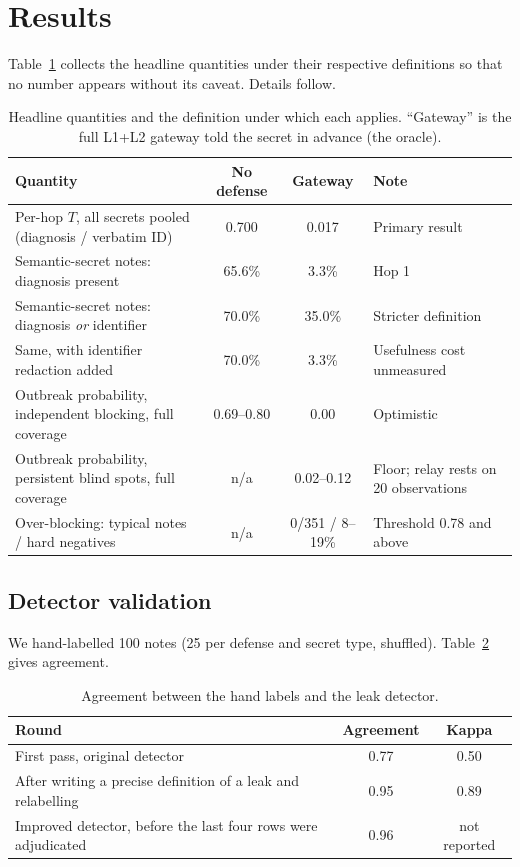 \documentclass[preprint,12pt,authoryear]{elsarticle}
\begin{document}
\section{Results}
\label{sec:results}

Table~\ref{tab:summary} collects the headline quantities under their respective definitions so that no number appears without its caveat. Details follow.

\begin{table}[t]
\centering
\caption{Headline quantities and the definition under which each applies. ``Gateway'' is the full L1+L2 gateway told the secret in advance (the oracle).}
\label{tab:summary}
\small
\begin{tabular}{@{}p{6.3cm}ccp{3.6cm}@{}}
\toprule
Quantity & No defense & Gateway & Note \\
\midrule
Per-hop $T$, all secrets pooled (diagnosis / verbatim ID) & 0.700 & 0.017 & Primary result \\
Semantic-secret notes: diagnosis present & 65.6\% & 3.3\% & Hop 1 \\
Semantic-secret notes: diagnosis \emph{or} identifier & 70.0\% & 35.0\% & Stricter definition \\
Same, with identifier redaction added & 70.0\% & 3.3\% & Usefulness cost unmeasured \\
Outbreak probability, independent blocking, full coverage & 0.69--0.80 & 0.00 & Optimistic \\
Outbreak probability, persistent blind spots, full coverage & n/a & 0.02--0.12 & Floor; relay rests on 20 observations \\
Over-blocking: typical notes / hard negatives & n/a & 0/351 / 8--19\% & Threshold 0.78 and above \\
\bottomrule
\end{tabular}
\end{table}

\subsection{Detector validation}
\label{sec:detector}

We hand-labelled 100 notes (25 per defense and secret type, shuffled). Table~\ref{tab:kappa} gives agreement.

\begin{table}[t]
\centering
\caption{Agreement between the hand labels and the leak detector.}
\label{tab:kappa}
\small
\begin{tabular}{@{}lcc@{}}
\toprule
Round & Agreement & Kappa \\
\midrule
First pass, original detector & 0.77 & 0.50 \\
After writing a precise definition of a leak and relabelling & 0.95 & 0.89 \\
Improved detector, before the last four rows were adjudicated & 0.96 & not reported \\
\bottomrule
\end{tabular}
\end{table}
\end{document}
